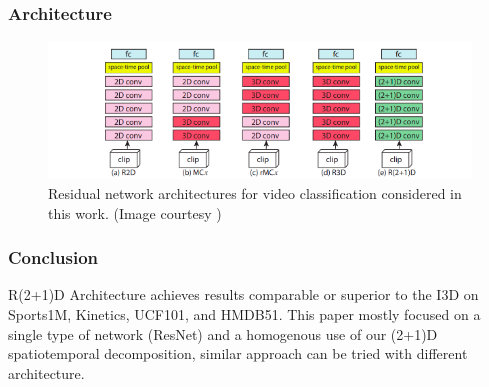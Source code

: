 \subsubsection{Architecture}

\begin{figure}[H]
	\includegraphics[width=\linewidth]{assets/img/r2+1d_arch.png}
	\caption{Residual network architectures for video classification considered in this work. (Image courtesy \cite{r(2+1)d})}
\end{figure}

\subsubsection{Conclusion}
\par R(2+1)D Architecture achieves results comparable or superior to the I3D on Sports1M, Kinetics, UCF101, and HMDB51.
This paper mostly focused on a single type of network (ResNet) and a homogenous use of our (2+1)D spatiotemporal decomposition, similar approach can be tried with different architecture. 
